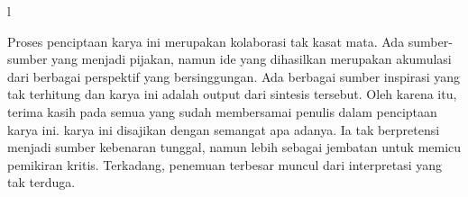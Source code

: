 \documentclass{SkripsiUnesa}
\begin{document}


\Awal
\HalamanJudul
\SampulDalam

\begin{Abstrak}
	
\lipsum[1-2]
l\end{Abstrak}
\newpage

\begin{Abstract}
	
\lipsum[1-2]
\end{Abstract}

\SuratPernyataan
\HalamanPersetujuan %
\HalamanPengesahan %

\Prakata

Proses penciptaan karya ini merupakan kolaborasi tak kasat mata. Ada sumber-sumber yang menjadi pijakan, namun ide yang dihasilkan merupakan akumulasi dari berbagai perspektif yang bersinggungan. Ada berbagai sumber inspirasi yang tak terhitung dan karya ini adalah output dari sintesis tersebut. Oleh karena itu, terima kasih pada semua yang sudah membersamai penulis dalam penciptaan karya ini. karya ini disajikan dengan semangat apa adanya. Ia tak berpretensi menjadi sumber kebenaran tunggal, namun lebih sebagai jembatan untuk memicu pemikiran kritis. Terkadang, penemuan terbesar muncul dari interpretasi yang tak terduga.
\end{document}
